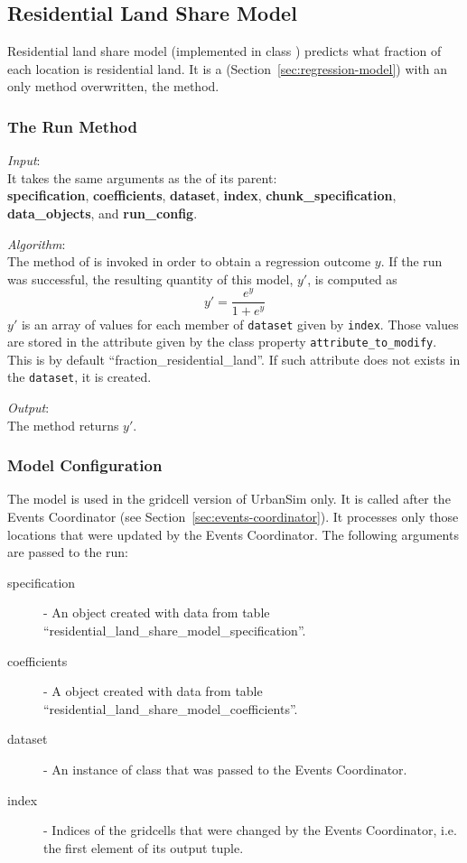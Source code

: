 %
\subsection{Residential Land Share Model}
%
\label{sec:residential-land-share-model}

Residential land share model (implemented in class
) predicts what fraction of each location is
residential land. It is a  
(Section~\ref{sec:regression-model}) with an only method overwritten, the
 method.

\subsubsection{The Run Method}
%
{\it Input}:\\[1mm]
It takes the same arguments as the  of its parent: \\
{\bf specification}, {\bf coefficients}, {\bf dataset}, {\bf index}, {\bf
  chunk_specification}, {\bf data_objects}, and {\bf run_config}.

{\it Algorithm}:\\[1mm]
The  method of  is invoked in order to
obtain a regression outcome $y$. If the run
was successful, the resulting quantity of this model, $y'$, is computed as
\[
y' = \frac{e^y}{1+e^y}
\]
$y'$ is an array of values for each member of \verb|dataset|  given by
\verb|index|. Those values are stored in the attribute  given by the class
property \verb|attribute_to_modify|. This is by default
``fraction_residential_land''. If such attribute does not exists in the
\verb|dataset|, it is created.

{\it Output}:\\[1mm]
The method returns $y'$.

\subsubsection{Model Configuration}
%
The model is used in the gridcell version of UrbanSim only.
It is called after the Events Coordinator (see Section~\ref{sec:events-coordinator}). 
It processes only those locations 
that were updated by the Events Coordinator.  The following
arguments are passed to the run:
\begin{description}
\item[specification] -  An
 object created with data from table
``residential_land_share_model_specification''. 
\item[coefficients] - A  object created
with data from table ``residential_land_share_model_coefficients''.
\item[dataset] - An instance of class  that was passed to
  the Events Coordinator.
\item[index] - Indices of the gridcells that were changed by the Events
  Coordinator, i.e. the first element of its output tuple.
\end{description}
 
